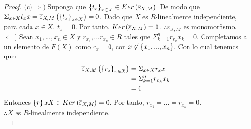 \documentclass{article}
\begin{document}
\begin{enumerate}[label=\textbf{Ej \arabic*.}]
\begin{proof}
			$\boxed{\text{(c)}} \boxed{\Rightarrow )}$ Suponga que ${\left\{{t}_{x}\right\}}_{x\in X} \in Ker\left(\overline{\varepsilon}_{X,M}\right)$. De modo que $\displaystyle\Sigma_{x \in X}t_{x}x=\overline{\varepsilon}_{X,M}\left({\left\{{t}_{x}\right\}}_{x\in X}\right)=0$. Dado que $X$ es $R$-linealmente independiente, para cada $x \in X$, $t_{x}=0$. Por tanto, $Ker\left(\overline{\varepsilon}_{X,M}\right)=0$. $\therefore\overline{\varepsilon}_{X,M}$ es monomorfismo.\\
			
			$\boxed{\Leftarrow )}$ Sean $x_{1},...,x_{n} \in X$ y $r_{x_{1}},...r_{x_{n}} \in R$ tales que $\displaystyle\Sigma_{k=1}^{n}r_{x_{k}}x_{k}=0$. Completamos a un elemento de $F(X)$ como $r_{x}=0$, con $x\not\in\left\{x_{1},...,x_{n}\right\}$. Con lo cual tenemos que:
			\begin{align*}
				\overline{\varepsilon}_{X,M}\left({\left\{{r}_{x}\right\}}_{x\in X}\right) &= \displaystyle\Sigma_{x \in X}r_{x}x\\
				&=\displaystyle\Sigma_{k=1}^{n}r_{x_{k}}x_{k}\\
				&=0
			\end{align*}
			Entonces $\left\{r\right\}{x}{X} \in Ker\left(\overline{\varepsilon}_{X,M}\right) = 0$. Por tanto, $r_{x_{1}}=...=r_{x_{n}}=0$.\\
			$\therefore X$ es $R$-linealmente independiente.\\
			

\end{proof}
\end{enumerate}
\end{document}
